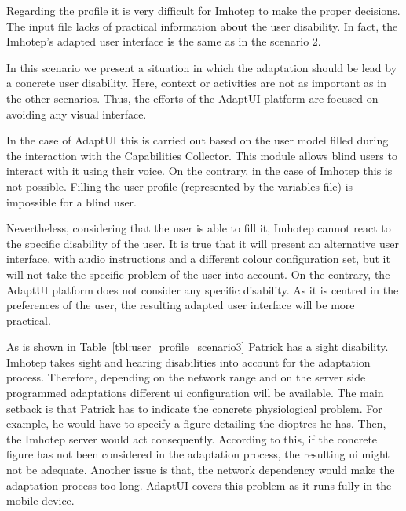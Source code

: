 
\inputminted[linenos=true, fontsize=\footnotesize, frame=lines]{json}{5_experiments_and_results/scenario3_imhotep.json}

Regarding the profile it is very difficult for Imhotep to make the 
proper decisions. The input file lacks of practical information about the user
disability. In fact, the Imhotep's adapted user interface is the same as in the
scenario 2.


\label{sec:scenario3_discussion}

In this scenario we present a situation in which the adaptation should be lead
by a concrete user disability. Here, context or activities are not as
important as in the other scenarios. Thus, the efforts of the AdaptUI platform
are focused on avoiding any visual interface. 

In the case of AdaptUI this is carried out based on the user model filled 
during the interaction with the Capabilities Collector. This module allows 
blind users to interact with it using their voice. On the contrary, in the case 
of Imhotep this is not possible. Filling the user profile (represented by the 
variables file) is impossible for a blind user.

Nevertheless, considering that the user is able to fill it, Imhotep cannot 
react to the specific disability of the user. It is true that it will present 
an alternative user interface, with audio instructions and a different colour 
configuration set, but it will not take the specific problem of the user into 
account. On the contrary, the AdaptUI platform does not consider any specific
disability. As it is centred in the preferences of the user, the resulting 
adapted user interface will be more practical.

\label{sec:scenario3_conclusions}

As is shown in Table~\ref{tbl:user_profile_scenario3} Patrick has a sight
disability. Imhotep takes sight and hearing disabilities into account for the
adaptation process. Therefore, depending on the network range and on the server
side programmed adaptations different \ac{ui} configuration will be available. 
The main setback is that Patrick has to indicate the concrete physiological 
problem. For example, he would have to specify a figure detailing the dioptres 
he has. Then, the Imhotep server would act consequently. According to this, if 
the concrete figure has not been considered in the adaptation process, the 
resulting \ac{ui} might not be adequate. Another issue is that, the network 
dependency would make the adaptation process too long. AdaptUI covers this problem 
as it runs fully in the mobile device.

